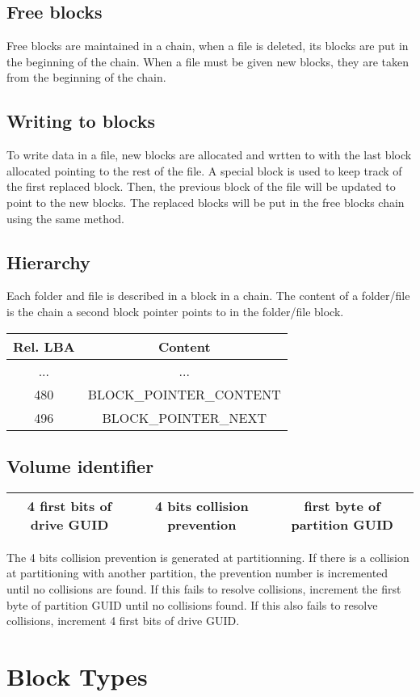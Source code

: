 \documentclass{article}
\begin{document}
\subsection{Free blocks}
Free blocks are maintained in a chain, when a file is deleted, its blocks are put in the beginning of the chain. When a file must be given new blocks, they are taken from the beginning of the chain.
\subsection{Writing to blocks} 
To write data in a file, new blocks are allocated and wrtten to with the last block allocated pointing to the rest of the file. A special block is used to keep track of the first replaced block.
Then, the previous block of the file will be updated to point to the new blocks.
The replaced blocks will be put in the free blocks chain using the same method.

\subsection{Hierarchy}
Each folder and file is described in a block in a chain. The content of a folder/file is the chain a second block pointer points to in the folder/file block.
\newline
\begin{tabular}{|c|c|}
  \hline
  Rel. LBA & Content \\
  \hline
  ... & ...  \\
  \hline
  480 & BLOCK\_POINTER\_CONTENT \\
  \hline
  496 & BLOCK\_POINTER\_NEXT \\
  \hline
\end{tabular}

\subsection{Volume identifier}

\begin{tabular}{|c|c|c|}
  \hline
  4 first bits of drive GUID & 4 bits collision prevention & first byte of partition GUID \\
  \hline
\end{tabular}
\newline
The 4 bits collision prevention is generated at partitionning. If there is a collision at partitioning with another partition, the prevention number is incremented until no collisions are found. If this fails to resolve collisions, increment the first byte of partition GUID until no collisions found. If this also fails to resolve collisions, increment 4 first bits of drive GUID.
\section{Block Types}
\end{document}

